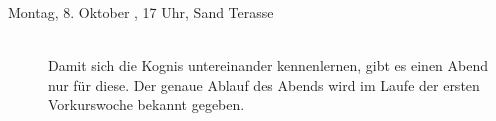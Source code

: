\begin{description}



\ifkogwiss

    \item[Montag, 8. Oktober \YEAR, 17 Uhr, Sand Terasse ]\ \\
    Damit sich die Kognis untereinander kennenlernen, gibt es einen Abend nur für diese. Der genaue Ablauf des Abends wird im Laufe der ersten Vorkurswoche bekannt gegeben.
\fi


\end{description}
